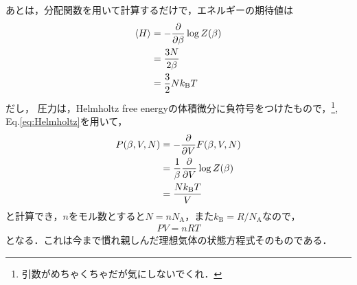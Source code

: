 \documentclass[dvipdfmx, a4paper]{jsarticle}
\theoremstyle{break}
\numberwithin{equation}{section}
\begin{document}
	あとは，分配関数を用いて計算するだけで，エネルギーの期待値は
	\begin{align}
			\langle H \rangle &= -\pdv{}{\beta}\log Z(\beta)\\
							  &= \frac{3N}{2\beta}\\
							  &= \frac{3}{2}Nk_{\text{B}}T
	\end{align}
	だし，
	圧力は，Helmholtz free energyの体積微分に負符号をつけたもので，\footnote{引数がめちゃくちゃだが気にしないでくれ．}, Eq.\eqref{eq:Helmholtz}を用いて，
	\begin{align}
			P(\beta, V, N) &= -\pdv{}{V}F(\beta, V, N)\\
						   &= \frac{1}{\beta}\pdv{}{V}\log Z(\beta)\\
						   &=\frac{Nk_{\text{B}}T}{V}
	\end{align}
	と計算でき，$n$をモル数とすると$N=nN_{\text{A}}$，また$k_{\text{B}} = R/N_{\text{A}}$なので，
	\begin{align}
			PV = nRT
	\end{align}
	となる．これは今まで慣れ親しんだ理想気体の状態方程式そのものである．
\end{document}
